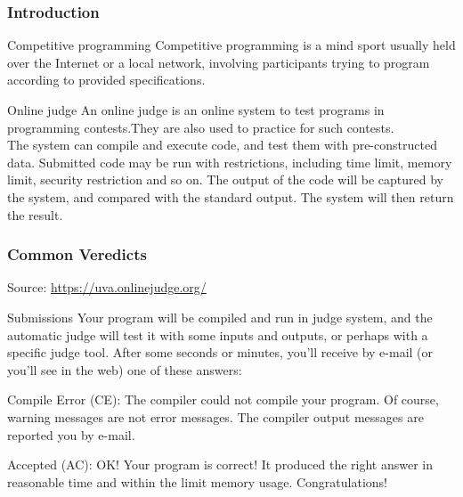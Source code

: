 \documentclass{beamer}
\begin{document}
\begin{frame}
	\frametitle{Introduction}
		\begin{block}{Competitive programming}
Competitive programming is a mind sport usually held over the Internet or a local network, involving participants trying to program according to provided specifications.
		\end{block}

		\begin{block}{Online judge}
		An online judge is an online system to test programs in programming contests.They are also used to practice for such contests.\\
		The system can compile and execute code, and test them with pre-constructed data. Submitted code may be run with restrictions, including time limit, memory limit, security restriction and so on. The output of the code will be captured by the system, and compared with the standard output. The system will then return the result. 
		\end{block}

\end{frame}

\begin{frame}
	\frametitle {Common Veredicts}
	Source: \href{https://uva.onlinejudge.org/index.php?option=com_content&task=view&id=16&Itemid=31}{https://uva.onlinejudge.org/}

	\begin{block}{Submissions}
	Your program will be compiled and run in judge system, and the automatic judge will test 	it with some inputs and outputs, or perhaps with a specific judge tool. After some seconds or minutes, you'll receive by e-mail (or you'll see in the web) one of these answers:
	\end{block}
	
	\begin{block}{Compile Error (CE):}
	The compiler could not compile your program. Of course, warning messages are not error messages. The compiler output messages are reported you by e-mail.
	\end{block}
	
	\begin{block}{Accepted (AC):}
	OK! Your program is correct! It produced the right answer in reasonable time and within the limit memory usage. Congratulations!
	\end{block}
	
	

\end{frame}
\end{document}
